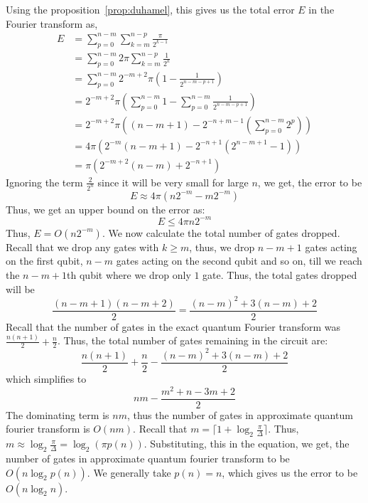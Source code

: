 Using the proposition~\ref{prop:duhamel}, this gives us the total error $E$ in the Fourier transform as,
\begin{align*}
    E&=\sum_{p=0}^{n-m}\sum_{k=m}^{n-p} \frac{\pi}{2^{k-1}}\\
    &=\sum_{p=0}^{n-m} 2\pi \sum_{k=m}^{n-p} \frac{1}{2^k}\\
    &=\sum_{p=0}^{n-m}  2^{-m+2}\pi\left(1-\frac{1}{2^{n-m-p+1}}\right)\\
    &=2^{-m+2}\pi\left( \sum_{p=0}^{n-m} 1 - \sum_{p=0}^{n-m} \frac{1}{2^{n-m-p+1}}\right)\\
    &=2^{-m+2}\pi \left((n-m+1) -2^{-n+m-1}\left(\sum_{p=0}^{n-m} 2^p\right) \right)\\
    &=4\pi\left( 2^{-m}(n-m+1) - 2^{-n+1}(2^{n-m+1}-1)\right)\\
    &=\pi(2^{-m+2}(n-m)+2^{-n+1})
\end{align*}
Ignoring the term $\frac{2}{2^n}$ since it will be very small for large $n$, we get, the error to be
\[
E \approx 4\pi(n2^{-m} - m2^{-m})
\]
Thus, we get an upper bound on the error as:
\[
E \leq 4\pi n2^{-m}
\]
Thus, $E=O(n2^{-m})$. We now calculate the total number of gates dropped. Recall that we drop any gates with $k\geq m$, thus, we drop $n-m+1$ gates acting on the first qubit, $n-m$ gates acting on the second qubit and so on, till we reach the $n-m+1$th qubit where we drop only $1$ gate. Thus, the total gates dropped will be
\[
\frac{(n-m+1)(n-m+2)}{2} =\frac{(n-m)^2+3(n-m)+2}{2}
\]
Recall that the number of gates in the exact quantum Fourier transform was $\frac{n(n+1)}{2}+\frac{n}{2}$. Thus, the total number of gates remaining in the circuit are:
\[
\frac{n(n+1)}{2} + \frac{n}{2}-\frac{(n-m)^2+3(n-m)+2}{2}
\]
which simplifies to
\[
nm - \frac{m^2+n-3m+2}{2}
\]
The dominating term is $nm$, thus the number of gates in approximate quantum fourier transform is $O(nm)$. Recall that $m=\lceil 1+\log_2\frac{\pi}{\Delta}\rceil$. Thus, $m\approx \log_2\frac{\pi}{\Delta}=\log_2 (\pi p(n))$. Substituting, this in the equation, we get, the number of gates in approximate quantum fourier transform to be $O(n\log_2 p(n))$. We generally take $p(n)=n$, which gives us the error to be $O(n\log_2n)$.

